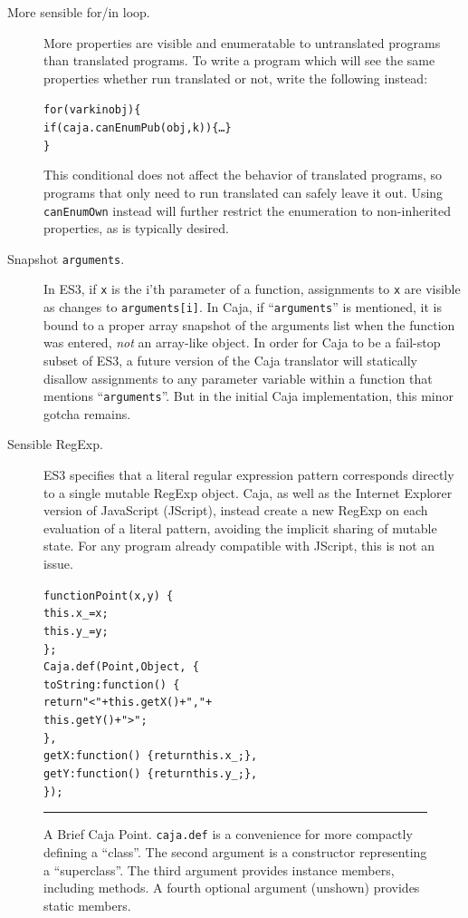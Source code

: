 \documentclass[letterpaper,twocolumn,10pt]{article}
\newcommand{\code}[1]{{\tt {#1}}}              %
\begin{document}
\begin{description}

  \item[More sensible for/in loop.] More properties are visible and
  enumeratable to untranslated programs than translated programs. To write a
  program which will see the same properties whether run translated or not,
  write the following instead:
\begin{alltt}
for (var k in obj) \{ 
  if (caja.canEnumPub(obj,k)) \{\ldots\}
\}
\end{alltt}
  This conditional does not affect the behavior of translated programs, so
  programs that only need to run translated can safely leave it out. Using
  \code{canEnumOwn} instead will further restrict the enumeration to
  non-inherited properties, as is typically desired.

  \item[Snapshot \code{arguments}.] In ES3, if \code{x} is the i'th parameter 
  of a function, assignments to \code{x} are visible as changes to 
  \code{arguments[i]}. In Caja, if ``\code{arguments}'' is mentioned, it is 
  bound to a proper array snapshot of the arguments list when the function 
  was entered, \emph{not} an array-like object. In order for Caja to be a 
  fail-stop subset of ES3, a future version of the Caja translator will 
  statically disallow assignments to any parameter variable within a function 
  that mentions ``\code{arguments}''. But in the initial Caja implementation, 
  this minor gotcha remains.
  
  \item[Sensible RegExp.] ES3 specifies that a literal regular expression 
  pattern corresponds directly to a single mutable RegExp object. Caja, as 
  well as the Internet Explorer version of JavaScript (JScript), instead 
  create a new RegExp on each evaluation of a literal pattern, avoiding the 
  implicit sharing of mutable state. For any program already compatible with 
  JScript, this is not an issue.
    
\end{description}

\begin{figure}[t!]
\begin{alltt}
function Point(x, y)\ \{
  this.x\_ = x;
  this.y\_ = y;
\};
Caja.def(Point, Object,\ \{
  toString: function()\ \{ 
    return "<" + this.getX() + "," + 
                 this.getY() + ">"; 
  \},
  getX: function()\ \{ return this.x\_; \},
  getY: function()\ \{ return this.y\_; \},
\});
\end{alltt}

\caption[A Brief Caja Point.]{A Brief Caja Point. \code{caja.def} is a 
convenience for more compactly defining a ``class''. The second argument is a 
constructor representing a ``superclass''. The third argument provides 
instance members, including methods. A fourth optional argument (unshown) 
provides static members. \\ } \hrule
\label{fig:brief-caja-point}
\end{figure}
\end{document}
